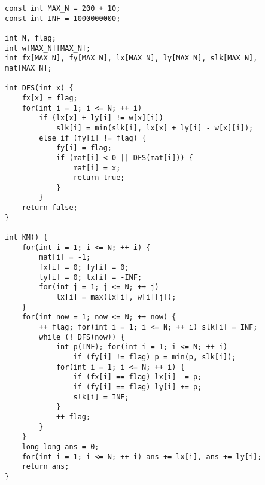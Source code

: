 \begin{lstlisting}
const int MAX_N = 200 + 10;
const int INF = 1000000000;

int N, flag;
int w[MAX_N][MAX_N];
int fx[MAX_N], fy[MAX_N], lx[MAX_N], ly[MAX_N], slk[MAX_N], mat[MAX_N];

int DFS(int x) {
    fx[x] = flag;
    for(int i = 1; i <= N; ++ i)
    	if (lx[x] + ly[i] != w[x][i])
        	slk[i] = min(slk[i], lx[x] + ly[i] - w[x][i]);
    	else if (fy[i] != flag) {
        	fy[i] = flag;
        	if (mat[i] < 0 || DFS(mat[i])) {
        	    mat[i] = x;
        	    return true;
        	}
    	}
    return false;
}

int KM() {
	for(int i = 1; i <= N; ++ i) {
        mat[i] = -1; 
        fx[i] = 0; fy[i] = 0;
        ly[i] = 0; lx[i] = -INF;
        for(int j = 1; j <= N; ++ j)
            lx[i] = max(lx[i], w[i][j]);
    }
    for(int now = 1; now <= N; ++ now) {
        ++ flag; for(int i = 1; i <= N; ++ i) slk[i] = INF;
        while (! DFS(now)) {
            int p(INF); for(int i = 1; i <= N; ++ i)
                if (fy[i] != flag) p = min(p, slk[i]);
            for(int i = 1; i <= N; ++ i) {
                if (fx[i] == flag) lx[i] -= p;
                if (fy[i] == flag) ly[i] += p;
                slk[i] = INF;
            }
            ++ flag;
        }
    }
    long long ans = 0;
    for(int i = 1; i <= N; ++ i) ans += lx[i], ans += ly[i];
    return ans;
}
\end{lstlisting}
